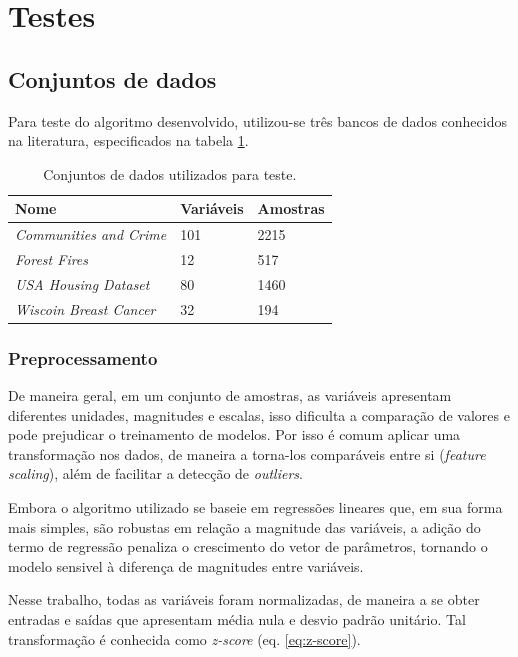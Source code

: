 \section{Testes}

\subsection{Conjuntos de dados}

Para teste do algoritmo desenvolvido, utilizou-se três bancos de dados conhecidos na literatura, 
especificados na tabela \ref{tbl:datasets}.
\begin{table}[H]
    \caption{Conjuntos de dados utilizados para teste.}
    \centering
    \begin{tabular}{@{}lll@{}}
    \toprule
    Nome                           & Variáveis & Amostras \\ \midrule
    \textit{Communities and Crime} & 101       & 2215     \\
    \textit{Forest Fires}          & 12        & 517      \\
    \textit{USA Housing Dataset}   & 80        & 1460     \\
    \textit{Wiscoin Breast Cancer} & 32        & 194      \\ \bottomrule
    \end{tabular}
    \label{tbl:datasets}
\end{table}

\subsubsection{Preprocessamento}

De maneira geral, em um conjunto de amostras, as variáveis apresentam diferentes unidades, magnitudes e escalas, isso dificulta a comparação de valores e pode prejudicar o treinamento de modelos. Por isso é comum aplicar uma transformação nos dados, de maneira a torna-los comparáveis entre si (\textit{feature scaling}), além de facilitar a detecção de \textit{outliers}.

Embora o algoritmo utilizado se baseie em regressões lineares que, em sua forma mais simples, são robustas em  relação a magnitude das variáveis, a adição do termo de regressão penaliza o crescimento do vetor de parâmetros, tornando o modelo sensivel à diferença de magnitudes entre variáveis.

Nesse trabalho, todas as variáveis foram normalizadas, de maneira a se obter entradas e saídas que apresentam média nula e desvio padrão unitário. Tal transformação é conhecida como \textit{z-score} (eq. \ref{eq:z-score}).

